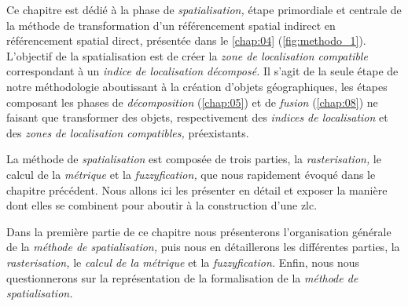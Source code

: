 Ce chapitre est dédié à la phase de \emph{spatialisation,} étape
primordiale et centrale de la méthode de transformation d'un
référencement spatial indirect en référencement spatial direct,
présentée dans le \autoref{chap:04} (\autoref{fig:methodo_1}).
%
L'objectif de la spatialisation est de créer la \emph{zone de
  localisation compatible} correspondant à un \emph{indice de
  localisation décomposé.} Il s'agit de la seule étape de notre
méthodologie aboutissant à la création d'objets géographiques, les
étapes composant les phases de \emph{décomposition}
(\autoref{chap:05}) et de \emph{fusion} (\autoref{chap:08}) ne faisant
que transformer des objets, respectivement des \emph{indices de
  localisation} et des \emph{zones de localisation compatibles,}
préexistants.

La méthode de \emph{spatialisation} est composée de trois parties, la
\emph{rasterisation,} le calcul de la \emph{métrique} et la
\emph{fuzzyfication,} que nous rapidement évoqué dans le chapitre
précédent. Nous allons ici les présenter en détail et exposer la
manière dont elles se combinent pour aboutir à la construction d'une
\ac{zlc}.

Dans la première partie de ce chapitre nous présenterons
l'organisation générale de la \emph{méthode de spatialisation,} puis
nous en détaillerons les différentes parties, la \emph{rasterisation,}
le \emph{calcul de la métrique} et la \emph{fuzzyfication.} Enfin,
nous nous questionnerons sur la représentation de la formalisation de
la \emph{méthode de spatialisation.}

